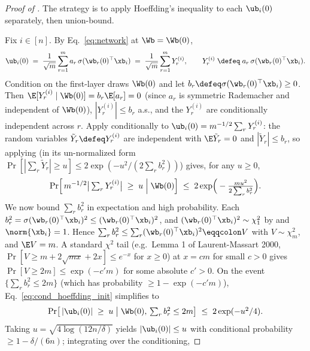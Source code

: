 \begin{proof}[Proof of ]
The strategy is to apply Hoeffding's inequality to each $\ub_i(0)$ separately, then union-bound.

Fix $i \in [n]$. By Eq.~\eqref{eq:network} at $\Wb = \Wb(0)$,
\begin{align*}
\ub_i(0)
\;=\; \frac{1}{\sqrt m} \sum_{r=1}^m a_r \, \sigma(\wb_r(0)^\top \xb_i)
\;=\; \frac{1}{\sqrt m} \sum_{r=1}^m Y_r^{(i)},
\qquad
Y_r^{(i)} \;\defeq\; a_r \, \sigma(\wb_r(0)^\top \xb_i).
\end{align*}
Condition on the first-layer draws $\Wb(0)$ and let $b_r \defeq \sigma(\wb_r(0)^\top \xb_i) \ge 0$. Then $\E[Y_r^{(i)} \mid \Wb(0)] = b_r \E[a_r] = 0$ (since $a_r$ is symmetric Rademacher and independent of $\Wb(0)$), $|Y_r^{(i)}| \le b_r$ a.s., and the $Y_r^{(i)}$ are conditionally independent across $r$. Apply  conditionally to $\ub_i(0) = m^{-1/2} \sum_r Y_r^{(i)}$: the random variables $\tilde Y_r \defeq Y_r^{(i)}$ are independent with $\E\tilde Y_r = 0$ and $|\tilde Y_r| \le b_r$, so applying  (in its un-normalized form $\Pr[|\sum_r \tilde Y_r| \ge u] \le 2 \exp(- u^2 / (2\sum_r b_r^2))$) gives, for any $u \ge 0$,
\begin{align}\label{eq:cond_hoeffding_init}
\Pr\!\Big[ \, m^{-1/2} \big|\textstyle\sum_r Y_r^{(i)}\big| \;\ge\; u \;\Big|\; \Wb(0) \Big] \;\le\; 2 \exp\!\Big( - \frac{m u^2}{2 \sum_r b_r^2} \Big).
\end{align}
We now bound $\sum_r b_r^2$ in expectation and high probability. Each $b_r^2 = \sigma(\wb_r(0)^\top \xb_i)^2 \le (\wb_r(0)^\top \xb_i)^2$, and $(\wb_r(0)^\top \xb_i)^2 \sim \chi^2_1$ by  and $\norm{\xb_i}=1$. Hence $\sum_r b_r^2 \le \sum_r (\wb_r(0)^\top \xb_i)^2 \eqqcolon V$ with $V \sim \chi^2_m$, and $\E V = m$. A standard $\chi^2$ tail (e.g.\ Lemma 1 of Laurent-Massart 2000, $\Pr[V \ge m + 2\sqrt{m x} + 2 x] \le e^{-x}$ for $x \ge 0$) at $x = c m$ for small $c > 0$ gives $\Pr[V \ge 2 m] \le \exp(- c' m)$ for some absolute $c' > 0$. On the event $\{\sum_r b_r^2 \le 2m\}$ (which has probability $\ge 1 - \exp(-c' m)$), Eq.~\eqref{eq:cond_hoeffding_init} simplifies to
\begin{align*}
\Pr\!\big[ \, |\ub_i(0)| \;\ge\; u \;\big|\; \Wb(0), \, \textstyle\sum_r b_r^2 \le 2 m \big] \;\le\; 2 \exp(- u^2 / 4).
\end{align*}
Taking $u = \sqrt{4 \log(12 n / \delta)}$ yields $|\ub_i(0)| \le u$ with conditional probability $\ge 1 - \delta / (6n)$; integrating over the conditioning,

\end{proof}
